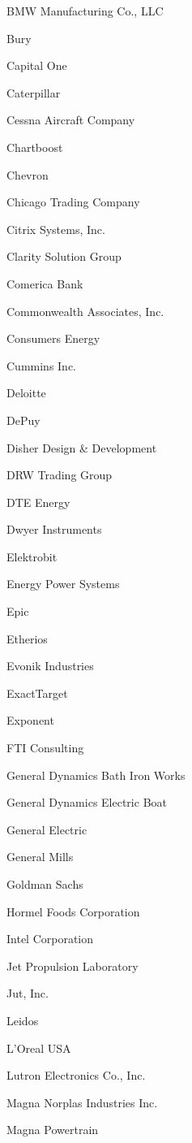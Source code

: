 \documentclass[twoside]{article}
\begin{document}
\begin{center}
\begin{multicols}{5}
\begin{FlushLeft}
\begin{compactitem}
\item BMW Manufacturing Co., LLC
\item Bury
\item Capital One
\item Caterpillar
\item Cessna Aircraft Company
\item Chartboost
\item Chevron
\item Chicago Trading Company
\item Citrix Systems, Inc.
\item Clarity Solution Group
\item Comerica Bank
\item Commonwealth Associates, Inc.
\item Consumers Energy
\item Cummins Inc.
\item Deloitte
\item DePuy
\item Disher Design \& Development
\item DRW Trading Group
\item DTE Energy
\item Dwyer Instruments
\item Elektrobit
\item Energy Power Systems
\item Epic
\item Etherios
\item Evonik Industries
\item ExactTarget
\item Exponent
\item FTI Consulting
\item General Dynamics Bath Iron Works
\item General Dynamics Electric Boat
\item General Electric
\item General Mills
\item Goldman Sachs
\item Hormel Foods Corporation
\item Intel Corporation
\item Jet Propulsion Laboratory
\item Jut, Inc.
\item Leidos
\item L'Oreal USA
\item Lutron Electronics Co., Inc.
\item Magna Norplas Industries Inc.
\item Magna Powertrain

\end{compactitem}
\end{FlushLeft}
\end{multicols}
\end{center}
\end{document}
